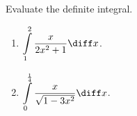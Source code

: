 Evaluate the definite integral.
\begin{enumerate}[ref={\fcProblemRef}]
\item \label{problemIntx/(2x^2+1)} $\displaystyle\int\limits_{1}^{2} \frac{x}{2x^2+1 }  \diff x$.

\item $\displaystyle\int\limits_{0}^{\frac{1}4}\frac{x }{\sqrt{1-3x^2}}\diff x$.


\end{enumerate}
